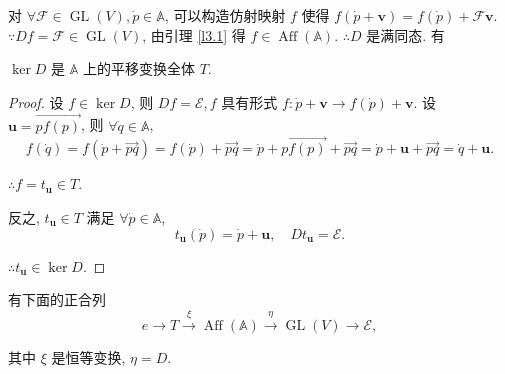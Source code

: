 \documentclass{ctexart}
\begin{document}
对 $\forall\mathcal{F}\in\operatorname{GL}(V),\dot{p}\in\mathbb{A}$, 可以构造仿射映射 $f$ 使得 $f(\dot{p}+\boldsymbol{v})=f(\dot{p})+\mathcal{F}\boldsymbol{v}$. $\because Df=\mathcal{F}\in\operatorname{GL}(V)$, 由引理 \ref{l3.1} 得 $f\in\operatorname{Aff}(\mathbb{A})$. $\therefore D$ 是满同态. 有
\begin{lemma}
    $\ker D$ 是 $\mathbb{A}$ 上的平移变换全体 $T$.
\end{lemma}
\begin{proof}
    设 $f\in\ker D$, 则 $Df=\mathcal{E},f$ 具有形式 $f:\dot{p}+\boldsymbol{v}\to f(\dot{p})+\boldsymbol{v}$. 设 $\boldsymbol{u}=\overrightarrow{pf(p)}$, 则 $\forall\dot{q}\in\mathbb{A}$,
    \[f(\dot{q})=f(\dot{p}+\overrightarrow{pq})=f(\dot{p})+\overrightarrow{pq}=\dot{p}+\overrightarrow{pf(p)}+\overrightarrow{pq}=\dot{p}+\boldsymbol{u}+\overrightarrow{pq}=\dot{q}+\boldsymbol{u}.\]

    $\therefore f=t_{\boldsymbol{u}}\in T$.

    反之, $t_{\boldsymbol{u}}\in T$ 满足 $\forall\dot{p}\in\mathbb{A}$,
    \[t_{\boldsymbol{u}}(\dot{p})=\dot{p}+\boldsymbol{u},\quad Dt_{\boldsymbol{u}}=\mathcal{E}.\]

    $\therefore t_{\boldsymbol{u}}\in\ker D$.
\end{proof}
有下面的正合列
\begin{equation}\label{eq3.1}
    e\to T\xrightarrow{\xi}\operatorname{Aff}(\mathbb{A})\xrightarrow{\eta}\operatorname{GL}(V)\to\mathcal{E},
\end{equation}

其中 $\xi$ 是恒等变换, $\eta=D$.
\end{document}
